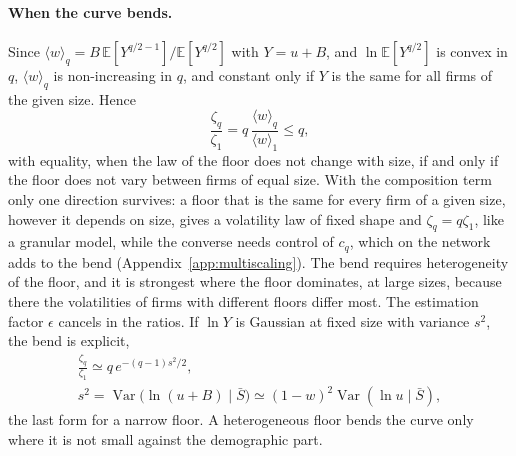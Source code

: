 \documentclass[pre,twocolumn,superscriptaddress,nofootinbib]{revtex4-2}
\newcommand{\E}{\mathbb E}
\newcommand{\Var}{\operatorname{Var}}
\newcommand{\Sb}{\bar S}
\begin{document}
\paragraph{When the curve bends.}  Since $\langle w\rangle_q=B\,\E[Y^{q/2-1}]/\E[Y^{q/2}]$ with $Y=u+B$, and
$\ln\E[Y^{q/2}]$ is convex in $q$, $\langle w\rangle_q$ is non-increasing in $q$, and constant only if $Y$ is
the same for all firms of the given size.  Hence
\begin{equation}
\frac{\zeta_q}{\zeta_1}=q\,\frac{\langle w\rangle_q}{\langle w\rangle_1}\le q,
\label{eq:bend}
\end{equation}
with equality, when the law of the floor does not change with size, if and only if the floor does not
vary between firms of equal size.  With the composition term only one direction survives: a floor
that is the same for every firm of a given size, however it depends on size, gives a volatility law
of fixed shape and $\zeta_q=q\zeta_1$, like a granular model, while the converse needs control of $c_q$,
which on the network adds to the bend (Appendix~\ref{app:multiscaling}).  The bend requires heterogeneity of the floor, and it is
strongest where the floor dominates, at large sizes, because there the volatilities of firms with
different floors differ most.  The estimation factor $\epsilon$ cancels in the ratios.  If $\ln Y$ is
Gaussian at fixed size with variance $s^2$, the bend is explicit,
\begin{gather}
\frac{\zeta_q}{\zeta_1}\simeq q\,e^{-(q-1)s^2/2},\nonumber\\
s^2=\Var\big(\ln(u+B)\mid\Sb\big)\simeq(1-w)^2\Var(\ln u\mid\Sb),
\label{eq:lognormal}
\end{gather}
the last form for a narrow floor.  A heterogeneous floor bends the curve only where it is not small
against the demographic part.
\end{document}
